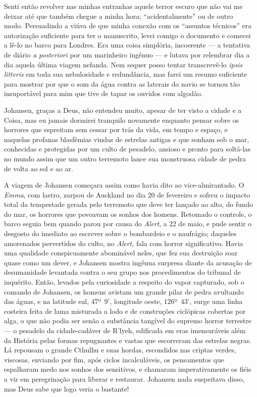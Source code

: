 Senti então revolver nas minhas entranhas aquele terror escuro que não
vai me deixar até que também chegue a minha hora; ``acidentalmente'' ou
de outro modo. Persuadindo a viúva de que minha conexão com os
``assuntos técnicos'' era autorização suficiente para ter o manuscrito,
levei comigo o documento e comecei a lê-lo no barco para Londres. Era
uma coisa simplória, incoerente --- a tentativa de diário \emph{a
posteriori} por um marinheiro ingênuo --- e lutava por relembrar
dia a dia aquela última viagem nefanda. Nem sequer posso tentar
transcrevê-lo \emph{ipsis litteris} em toda sua nebulosidade e
redundância, mas farei um resumo suficiente para mostrar por que o som
da água contra as laterais do navio se tornou tão insuportável para mim
que tive de tapar os ouvidos com algodão.

Johansen, graças a Deus, não entendeu muito, apesar de ter visto a
cidade e a Coisa, mas eu jamais dormirei tranquilo novamente enquanto
pensar sobre os horrores que espreitam sem cessar por trás da vida, em
tempo e espaço, e naquelas profanas blasfêmias vindas de estrelas
antigas e que sonham sob o mar, conhecidas e protegidas por um culto de
pesadelo, ansioso e pronto para soltá-las no mundo assim que um outro
terremoto lance sua monstruosa cidade de pedra de volta ao sol e ao ar.

A viagem de Johansen começara assim como havia dito ao vice-almirantado.
O \emph{Emma}, com lastro, zarpou de Auckland no dia 20 de fevereiro e
sofreu o impacto total da tempestade gerada pelo terremoto que deve ter
lançado ao alto, do fundo do mar, os horrores que povoavam os sonhos dos
homens. Retomado o controle, o barco seguia bem quando parou por causa
do \emph{Alert}, a 22 de maio, e pude sentir o desgosto do imediato ao
escrever sobre o bombardeio e o naufrágio; daqueles amorenados
pervertidos do culto, no \emph{Alert,} fala com horror significativo.
Havia uma qualidade conspicuamente abominável neles, que fez sua
destruição soar quase como um dever, e Johansen mostra ingênua surpresa
diante da acusação de desumanidade levantada contra o seu grupo nos
procedimentos do tribunal de inquérito. Então, levados pela curiosidade
a respeito do vapor capturado, sob o comando de Johansen, os homens
avistam um grande pilar de pedra avultando das águas, e na latitude sul,
47º~9', longitude oeste, 126º~43', surge uma linha costeira feita de
lama misturada a lodo e de construções ciclópicas cobertas por alga, o
que não podia ser senão a substância tangível do supremo horror
terrestre --- o pesadelo da cidade-cadáver de R'lyeh, edificada em eras
imensuráveis além da História pelas formas repugnantes e vastas que
escorreram das estrelas negras. Lá repousam o grande Cthulhu e suas
hordas, escondidos nas criptas verdes, viscosas, enviando por fim, após
ciclos incalculáveis, os pensamentos que espalharam medo nos sonhos dos
sensitivos, e chamaram imperativamente os fiéis a vir em peregrinação
para liberar e restaurar. Johansen nada suspeitava disso, mas Deus sabe
que logo veria o bastante!

